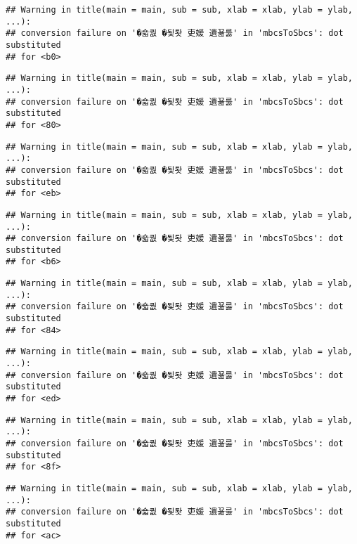 \documentclass[]{article}
\begin{document}
\begin{verbatim}
## Warning in title(main = main, sub = sub, xlab = xlab, ylab = ylab, ...):
## conversion failure on '�숇퀎 �됯퇏 吏媛 遺꾪룷' in 'mbcsToSbcs': dot substituted
## for <b0>
\end{verbatim}

\begin{verbatim}
## Warning in title(main = main, sub = sub, xlab = xlab, ylab = ylab, ...):
## conversion failure on '�숇퀎 �됯퇏 吏媛 遺꾪룷' in 'mbcsToSbcs': dot substituted
## for <80>
\end{verbatim}

\begin{verbatim}
## Warning in title(main = main, sub = sub, xlab = xlab, ylab = ylab, ...):
## conversion failure on '�숇퀎 �됯퇏 吏媛 遺꾪룷' in 'mbcsToSbcs': dot substituted
## for <eb>
\end{verbatim}

\begin{verbatim}
## Warning in title(main = main, sub = sub, xlab = xlab, ylab = ylab, ...):
## conversion failure on '�숇퀎 �됯퇏 吏媛 遺꾪룷' in 'mbcsToSbcs': dot substituted
## for <b6>
\end{verbatim}

\begin{verbatim}
## Warning in title(main = main, sub = sub, xlab = xlab, ylab = ylab, ...):
## conversion failure on '�숇퀎 �됯퇏 吏媛 遺꾪룷' in 'mbcsToSbcs': dot substituted
## for <84>
\end{verbatim}

\begin{verbatim}
## Warning in title(main = main, sub = sub, xlab = xlab, ylab = ylab, ...):
## conversion failure on '�숇퀎 �됯퇏 吏媛 遺꾪룷' in 'mbcsToSbcs': dot substituted
## for <ed>
\end{verbatim}

\begin{verbatim}
## Warning in title(main = main, sub = sub, xlab = xlab, ylab = ylab, ...):
## conversion failure on '�숇퀎 �됯퇏 吏媛 遺꾪룷' in 'mbcsToSbcs': dot substituted
## for <8f>
\end{verbatim}

\begin{verbatim}
## Warning in title(main = main, sub = sub, xlab = xlab, ylab = ylab, ...):
## conversion failure on '�숇퀎 �됯퇏 吏媛 遺꾪룷' in 'mbcsToSbcs': dot substituted
## for <ac>
\end{verbatim}
\end{document}
